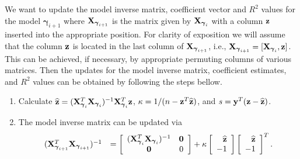 \documentclass[12pt]{article}
\def\vectorfontone{\bf}
\def\vectorfonttwo{\boldsymbol}
\def\vy{{\vectorfontone y}}                      %
\def\vz{{\vectorfontone z}}                      %
\def\vzero{{\vectorfontone 0}}
\def\vgamma{{\vectorfonttwo \gamma}}             %
\def\matrixfontone{\bf}
\def\mI{{\matrixfontone I}}                      %
\def\mX{{\matrixfontone X}}                      %
\def\ds{\displaystyle}
\begin{document}
We want to update the model inverse matrix, coefficient vector and $R^2$ values for the model $\vgamma_{i+1}$ where $\mX_{\vgamma_{i+1}}$ is the matrix given by $\mX_{\vgamma_i}$ with a column $\vz$ inserted into the appropriate position.
For clarity of exposition we will assume that the column $\vz$ is located in the last column of $\mX_{\vgamma_{i+1}}$, i.e., $\mX_{\vgamma_{i+1}} = [\mX_{\vgamma_{i}},\vz]$. This can be achieved, if necessary, by appropriate permuting  columns of various matrices.
Then the updates for the model inverse matrix, coefficient estimates, and $R^2$ values can be obtained by following the steps bellow.
\begin{enumerate}
	\item Calculate $\widehat{\vz} = (\mX_{\vgamma_i}^T\mX_{\vgamma_i})^{-1}\mX_{\vgamma_i}^T\vz$, 
	$\kappa 
	= 1/(n - \vz^T\widehat{\vz})$, and  $s = \vy^T(\vz - \widehat{\vz})$.
	
	\item The model inverse matrix can be updated via  
	$$
	\begin{array}{rl}
	(\mX_{\vgamma_{i+1}}^T\mX_{\vgamma_{i+1}})^{-1}
	&\ds = 
	\left[ \begin{array}{cc}
	(\mX_{\vgamma_{i}}^T\mX_{\vgamma_{i}})^{-1}    & \vzero \\
	\vzero             
	& 0
	\end{array} \right] + \kappa \left[ \begin{array}{r}
	\widehat{\vz} \\
	-1 \\
	\end{array} \right] \left[ \begin{array}{r}
	\widehat{\vz} \\
	-1 \\
	\end{array} \right]^T.
	\end{array} 
	$$
	

\end{enumerate}
\end{document}
